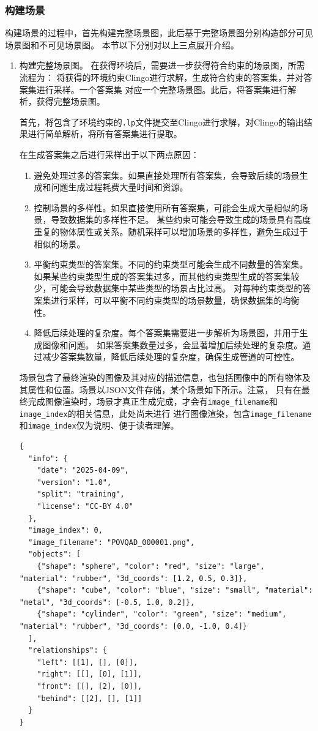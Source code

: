 \subsubsection{构建场景}
构建场景的过程中，首先构建完整场景图，此后基于完整场景图分别构造部分可见场景图和不可见场景图。
本节以下分别对以上三点展开介绍。
\begin{enumerate}[nosep]
\item 构建完整场景图。
在获得环境后，需要进一步获得符合约束的场景图，所需流程为：
将获得的环境约束Clingo进行求解，生成符合约束的答案集，并对答案集进行采样。一个答案集
对应一个完整场景图。此后，将答案集进行解析，获得完整场景图。

首先，将包含了环境约束的\texttt{.lp}文件提交至Clingo进行求解，对Clingo的输出结果进行简单解析，将所有答案集进行提取。

在生成答案集之后进行采样出于以下两点原因：
\begin{enumerate}[nosep]
\item 避免处理过多的答案集。如果直接处理所有答案集，会导致后续的场景生成和问题生成过程耗费大量时间和资源。
\item 控制场景的多样性。如果直接使用所有答案集，可能会生成大量相似的场景，导致数据集的多样性不足。
某些约束可能会导致生成的场景具有高度重复的物体属性或关系。随机采样可以增加场景的多样性，避免生成过于相似的场景。
\item 平衡约束类型的答案集。不同的约束类型可能会生成不同数量的答案集。
如果某些约束类型生成的答案集过多，而其他约束类型生成的答案集较少，可能会导致数据集中某些类型的场景占比过高。
对每种约束类型的答案集进行采样，可以平衡不同约束类型的场景数量，确保数据集的均衡性。
\item 降低后续处理的复杂度。每个答案集需要进一步解析为场景图，并用于生成图像和问题。
如果答案集数量过多，会显著增加后续处理的复杂度。通过减少答案集数量，降低后续处理的复杂度，确保生成管道的可控性。
\end{enumerate}

场景包含了最终渲染的图像及其对应的描述信息，也包括图像中的所有物体及其属性和位置。场景以JSON文件存储，某个场景如下所示。注意，
只有在最终完成图像渲染时，场景才真正生成完成，才会有\texttt{image\_filename}和\texttt{image\_index}的相关信息，此处尚未进行
进行图像渲染，包含\texttt{image\_filename}和\texttt{image\_index}仅为说明、便于读者理解。
\begin{lstlisting}
{
  "info": {
    "date": "2025-04-09",
    "version": "1.0",
    "split": "training",
    "license": "CC-BY 4.0"
  },
  "image_index": 0,
  "image_filename": "POVQAD_000001.png",
  "objects": [
    {"shape": "sphere", "color": "red", "size": "large", "material": "rubber", "3d_coords": [1.2, 0.5, 0.3]},
    {"shape": "cube", "color": "blue", "size": "small", "material": "metal", "3d_coords": [-0.5, 1.0, 0.2]},
    {"shape": "cylinder", "color": "green", "size": "medium", "material": "rubber", "3d_coords": [0.0, -1.0, 0.4]}
  ],
  "relationships": {
    "left": [[1], [], [0]],
    "right": [[], [0], [1]],
    "front": [[], [2], [0]],
    "behind": [[2], [], [1]]
  }
}
\end{lstlisting}


\end{enumerate}
